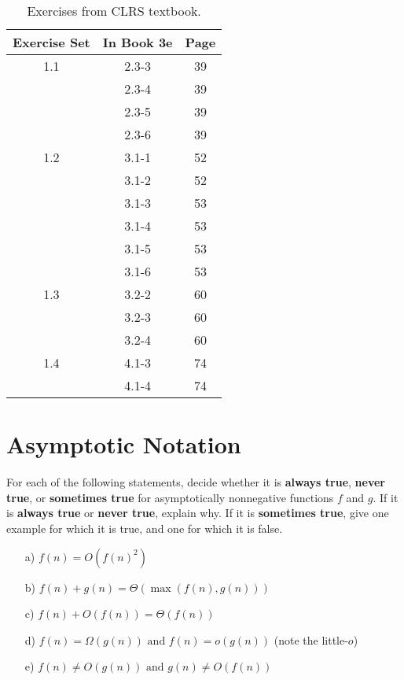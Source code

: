 \documentclass[11pt]{article}
\begin{document}
\begin{table}[t]
    \centering
    \begin{tabular}{c c c}
        \toprule
        \textbf{Exercise Set} & \textbf{In Book 3e} & \textbf{Page} \\
        \midrule
        1.1 & 2.3-3 & 39 \\
            & 2.3-4 & 39 \\
            & 2.3-5 & 39 \\
            & 2.3-6 & 39 \\
        1.2 & 3.1-1 & 52 \\
            & 3.1-2 & 52 \\
            & 3.1-3 & 53 \\
            & 3.1-4 & 53 \\
            & 3.1-5 & 53 \\
            & 3.1-6 & 53 \\
        1.3 & 3.2-2 & 60 \\
            & 3.2-3 & 60 \\
            & 3.2-4 & 60 \\
        1.4 & 4.1-3 & 74 \\
            & 4.1-4 & 74 \\
        \bottomrule
    \end{tabular}
    \caption{Exercises from CLRS textbook.}
    \label{tab:table}
\end{table}

\section{Asymptotic Notation}\label{sec:asymptotic}

For each of the following statements, decide whether it is \textbf{always true}, \textbf{never true}, or \textbf{sometimes true} for asymptotically nonnegative functions $f$ and $g$. If it is \textbf{always true} or \textbf{never true}, explain why. If it is \textbf{sometimes true}, give one example for which it is true, and one for which it is false.

\begin{enumerate}
    \item[a)] $f(n) = O(f(n)^2)$
    \item[b)] $f(n) + g(n) = \Theta(\max(f(n), g(n)))$
    \item[c)] $f(n) + O(f(n)) = \Theta(f(n))$
    \item[d)] $f(n) = \Omega(g(n)) \text{ and } f(n) = o(g(n))$ \hspace{5mm} (note the little-$o$)
    \item[e)] $f(n) \neq O(g(n)) \text{ and } g(n) \neq O(f(n))$
\end{enumerate}
\end{document}
